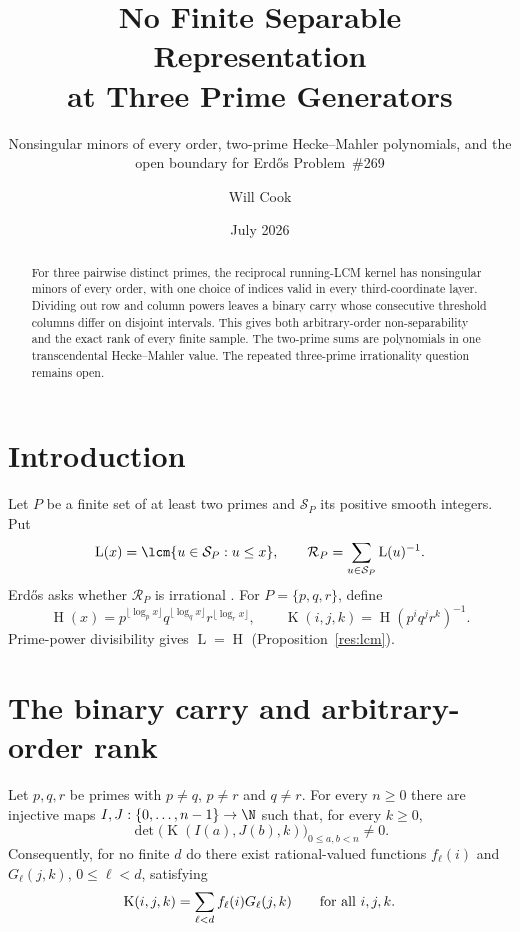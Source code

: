 \documentclass[11pt]{article}
\title{No Finite Separable Representation\\at Three Prime Generators}
\subtitle{Nonsingular minors of every order, two-prime Hecke--Mahler
polynomials, and the open boundary for Erd\H{o}s Problem~\#269}
\author{Will Cook}
\date{July 2026}
\newcommand{\hgt}{\operatorname{H}}
\newcommand{\Lprefix}{\operatorname{L}}
\newcommand{\Kernel}{\operatorname{K}}
\begin{document}
\maketitle
\noteprovenance

\begin{abstract}
For three pairwise distinct primes, the reciprocal running-LCM kernel has
nonsingular minors of every order, with one choice of indices valid in every
third-coordinate layer.  Dividing out row and column powers leaves a binary
carry whose consecutive threshold columns differ on disjoint intervals.
This gives both arbitrary-order non-separability and the exact rank of every
finite sample.  The two-prime sums are polynomials in one transcendental
Hecke--Mahler value.  The repeated three-prime irrationality question remains
open.
\end{abstract}

\section{Introduction}\label{sec:problem}
Let $P$ be a finite set of at least two primes and $\mathcal S_P$ its positive
smooth integers.  Put
\[
 \Lprefix(x)=\lcm\{u\in\mathcal S_P:u\le x\},\qquad
 \mathcal R_P=\sum_{u\in\mathcal S_P}\Lprefix(u)^{-1}.
\]
Erd\H{o}s asks whether $\mathcal R_P$ is irrational
\cite[p.~65]{erdosgraham1980}\cite[p.~106]{erdos1988}.
For $P=\{p,q,r\}$, define
\[
 \hgt(x)=p^{\lfloor\log_p x\rfloor}
 q^{\lfloor\log_q x\rfloor}r^{\lfloor\log_r x\rfloor},\qquad
 \Kernel(i,j,k)=\hgt(p^iq^jr^k)^{-1}.
\]
Prime-power divisibility gives $\Lprefix=\hgt$
(Proposition~\ref{res:lcm}).

\section{The binary carry and arbitrary-order rank}\label{sec:rank}

\begin{theorem}\label{res:infinite-rank}
Let $p,q,r$ be primes with $p\ne q$, $p\ne r$ and $q\ne r$.  For every
$n\ge0$ there are injective maps $I,J:\{0,\ldots,n-1\}\to\N$ such that, for
every $k\ge0$,
\[
 \det\bigl(\Kernel(I(a),J(b),k)\bigr)_{0\le a,b<n}\ne0.
\]
Consequently, for no finite $d$ do there exist rational-valued functions
$f_\ell(i)$ and $G_\ell(j,k)$, $0\le\ell<d$, satisfying
\[
 \Kernel(i,j,k)=\sum_{\ell<d}f_\ell(i)G_\ell(j,k)
 \qquad\hbox{for all }i,j,k.
\]
\end{theorem}
\end{document}
